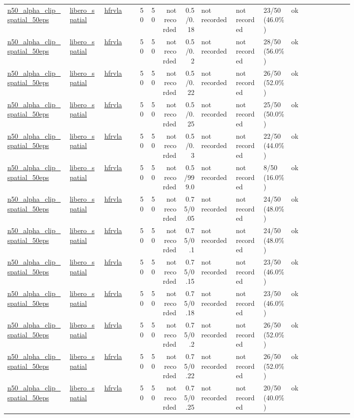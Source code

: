 \begin{tiny}
\begin{longtable}{@{}p{0.18\linewidth}p{0.10\linewidth}p{0.10\linewidth}rrrrp{0.10\linewidth}p{0.08\linewidth}p{0.08\linewidth}p{0.11\linewidth}p{0.07\linewidth}@{}}
\url{n50_alpha_clip_spatial_50eps} & \url{libero_spatial} & \url{hfrvla} & 50 & 50 & not recorded & 0.5/0.18 & not recorded & not recorded & 23/50 (46.0\%) & ok \\
\url{n50_alpha_clip_spatial_50eps} & \url{libero_spatial} & \url{hfrvla} & 50 & 50 & not recorded & 0.5/0.2 & not recorded & not recorded & 28/50 (56.0\%) & ok \\
\url{n50_alpha_clip_spatial_50eps} & \url{libero_spatial} & \url{hfrvla} & 50 & 50 & not recorded & 0.5/0.22 & not recorded & not recorded & 26/50 (52.0\%) & ok \\
\url{n50_alpha_clip_spatial_50eps} & \url{libero_spatial} & \url{hfrvla} & 50 & 50 & not recorded & 0.5/0.25 & not recorded & not recorded & 25/50 (50.0\%) & ok \\
\url{n50_alpha_clip_spatial_50eps} & \url{libero_spatial} & \url{hfrvla} & 50 & 50 & not recorded & 0.5/0.3 & not recorded & not recorded & 22/50 (44.0\%) & ok \\
\url{n50_alpha_clip_spatial_50eps} & \url{libero_spatial} & \url{hfrvla} & 50 & 50 & not recorded & 0.5/999.0 & not recorded & not recorded & 8/50 (16.0\%) & ok \\
\url{n50_alpha_clip_spatial_50eps} & \url{libero_spatial} & \url{hfrvla} & 50 & 50 & not recorded & 0.75/0.05 & not recorded & not recorded & 24/50 (48.0\%) & ok \\
\url{n50_alpha_clip_spatial_50eps} & \url{libero_spatial} & \url{hfrvla} & 50 & 50 & not recorded & 0.75/0.1 & not recorded & not recorded & 24/50 (48.0\%) & ok \\
\url{n50_alpha_clip_spatial_50eps} & \url{libero_spatial} & \url{hfrvla} & 50 & 50 & not recorded & 0.75/0.15 & not recorded & not recorded & 23/50 (46.0\%) & ok \\
\url{n50_alpha_clip_spatial_50eps} & \url{libero_spatial} & \url{hfrvla} & 50 & 50 & not recorded & 0.75/0.18 & not recorded & not recorded & 23/50 (46.0\%) & ok \\
\url{n50_alpha_clip_spatial_50eps} & \url{libero_spatial} & \url{hfrvla} & 50 & 50 & not recorded & 0.75/0.2 & not recorded & not recorded & 26/50 (52.0\%) & ok \\
\url{n50_alpha_clip_spatial_50eps} & \url{libero_spatial} & \url{hfrvla} & 50 & 50 & not recorded & 0.75/0.22 & not recorded & not recorded & 26/50 (52.0\%) & ok \\
\url{n50_alpha_clip_spatial_50eps} & \url{libero_spatial} & \url{hfrvla} & 50 & 50 & not recorded & 0.75/0.25 & not recorded & not recorded & 20/50 (40.0\%) & ok \\

\end{longtable}
\end{tiny}
